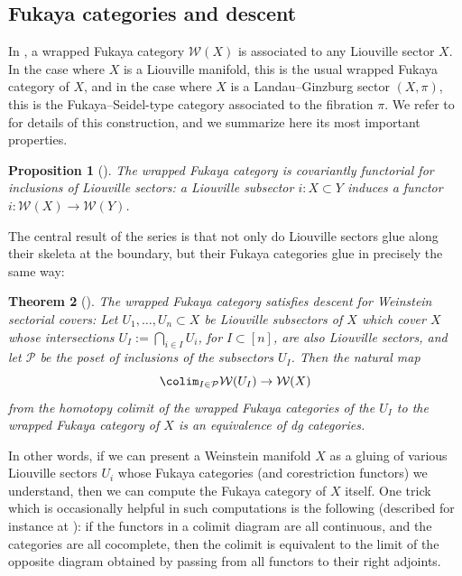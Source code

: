 \documentclass[pdftex]{sigma}%
\numberwithin{equation}{section}
\newtheorem{Theorem}{Theorem}[section]
\newtheorem{Proposition}[Theorem]{Proposition}
\def\cW{\mathcal{W}}
\def\calP{\mathcal{P}}
\begin{document}
\subsection{Fukaya categories and descent}
In \cite{GPS1}, a wrapped Fukaya category $\cW(X)$ is associated to any Liouville sector $X$. In the case where $X$ is a Liouville manifold, this is the usual wrapped Fukaya category of $X$, and in the case where $X$ is a Landau--Ginzburg sector $(X,\pi)$, this is the Fukaya--Seidel-type category associated to the fibration $\pi$.
We refer to \cite{GPS2,GPS3,GPS1} for details of this construction, and we summarize here its most important properties.

\begin{Proposition}[\cite{GPS1}]
 The wrapped Fukaya category is covariantly functorial for inclusions of Liouville sectors: a Liouville subsector $i\colon X\subset Y$ induces a functor $i\colon \cW(X)\to \cW(Y)$.
\end{Proposition}

The central result of the series \cite{GPS2,GPS3,GPS1} is that not only do Liouville sectors glue along their skeleta at the boundary, but their Fukaya categories glue in precisely the same way:

\begin{Theorem}[\cite{GPS2}]\label{thm:codescent}
 The wrapped Fukaya category satisfies descent for Weinstein sectorial covers: Let $U_1,\dots,U_n\subset X$ be Liouville subsectors of $X$ which cover $X$ whose intersections $U_I:=\bigcap_{i\in I}U_i$, for $I\subset[n]$, are also Liouville sectors, and let $\calP$ be the poset of inclusions of the subsectors $U_I$. Then the natural map
 \[
 	\colim_{I\in \calP}\cW(U_I)\to \cW(X)
 \]
 from the homotopy colimit of the wrapped Fukaya categories of the $U_I$ to the wrapped Fukaya category of $X$ is an equivalence of dg categories.
\end{Theorem}

In other words, if we can present a Weinstein manifold $X$ as a gluing of various Liouville sectors $U_i$ whose Fukaya categories (and corestriction functors) we understand, then we can compute the Fukaya category of $X$ itself. One trick which is occasionally helpful in such computations is the following (described for instance at \cite[Lemma 1.3.3]{Gaits-DG}): if the functors in a colimit diagram are all continuous, and the categories are all cocomplete, then the colimit is equivalent to the limit of the opposite diagram obtained by passing from all functors to their right adjoints.
\end{document}
